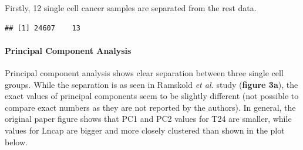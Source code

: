 \documentclass[]{article}
\newenvironment{Shaded}{\begin{snugshade}}{\end{snugshade}}
\newcommand{\KeywordTok}[1]{\textcolor[rgb]{0.13,0.29,0.53}{\textbf{#1}}}
\newcommand{\DecValTok}[1]{\textcolor[rgb]{0.00,0.00,0.81}{#1}}
\newcommand{\StringTok}[1]{\textcolor[rgb]{0.31,0.60,0.02}{#1}}
\newcommand{\OperatorTok}[1]{\textcolor[rgb]{0.81,0.36,0.00}{\textbf{#1}}}
\newcommand{\NormalTok}[1]{#1}
\let\oldparagraph\paragraph
\renewcommand{\paragraph}[1]{\oldparagraph{#1}\mbox{}}
\begin{document}
Firstly, 12 single cell cancer samples are separated from the rest data.

\begin{Shaded}
\end{Shaded}

\begin{verbatim}
## [1] 24607    13
\end{verbatim}

\paragraph{Principal Component
Analysis}\label{principal-component-analysis}

Principal component analysis shows clear separation between three single
cell groups. While the separation is as seen in Ramskold \emph{et al.}
study (\textbf{figure 3a}), the exact values of principal components
seem to be slightly different (not possible to compare exact numbers as
they are not reported by the authors). In general, the original paper
figure shows that PC1 and PC2 values for T24 are smaller, while values
for Lncap are bigger and more closely clustered than shown in the plot
below.
\end{document}
